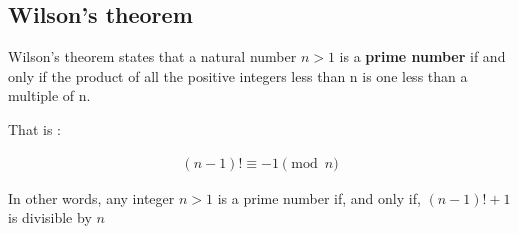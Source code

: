 \subsection{Wilson's theorem}

Wilson's theorem states that a natural number $n > 1$ is a \textbf{prime number} if and only if the product of all the positive integers less than n is one less than a multiple of n.

That is :

\begin{equation}
  \begin{array}{c}
    (n-1)! \equiv -1 \pmod{n}
  \end{array}
\end{equation}

In other words, any integer $n > 1$ is a prime number if, and only if, $(n − 1)! + 1 $is divisible by $n$
